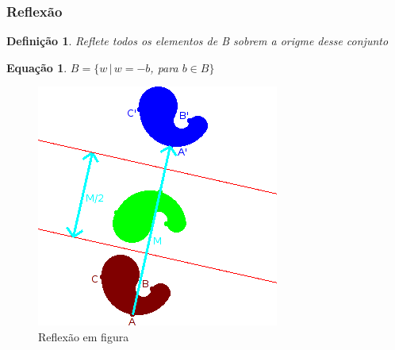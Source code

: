 \documentclass[aspectratio=169]{beamer}
\theoremstyle{Definition}
\newtheorem{defn}{Defini\c c\~ao}
\newtheorem{eq}[theorem]{Equa\c c\~ao}
\begin{document}
\begin{frame}
	\frametitle{Reflexão}
	
	\begin{defn}
    	Reflete todos os elementos de B sobrem a origme desse conjunto
	\end{defn}

	\begin{eq}
    	$ B = \{w \,|\, w = -b$, para $ b \in B  \}$ 
	\end{eq}
	
  \begin{figure}[h]
    \centering
    \includegraphics[height=0.3\paperheight]{imagens/reflect}
    \caption{Reflexão em figura}\label{figReflexao}
  \end{figure}
\end{frame}
\end{document}
